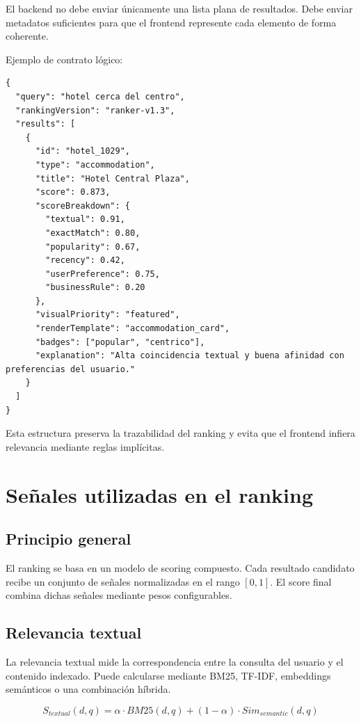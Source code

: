 \documentclass[12pt,a4paper]{article}
\begin{document}
El backend no debe enviar únicamente una lista plana de resultados. Debe enviar metadatos suficientes para que el frontend represente cada elemento de forma coherente.

Ejemplo de contrato lógico:

\begin{lstlisting}[caption={Ejemplo de respuesta enriquecida para ranking y renderizado}]
{
  "query": "hotel cerca del centro",
  "rankingVersion": "ranker-v1.3",
  "results": [
    {
      "id": "hotel_1029",
      "type": "accommodation",
      "title": "Hotel Central Plaza",
      "score": 0.873,
      "scoreBreakdown": {
        "textual": 0.91,
        "exactMatch": 0.80,
        "popularity": 0.67,
        "recency": 0.42,
        "userPreference": 0.75,
        "businessRule": 0.20
      },
      "visualPriority": "featured",
      "renderTemplate": "accommodation_card",
      "badges": ["popular", "centrico"],
      "explanation": "Alta coincidencia textual y buena afinidad con preferencias del usuario."
    }
  ]
}
\end{lstlisting}

Esta estructura preserva la trazabilidad del ranking y evita que el frontend infiera relevancia mediante reglas implícitas.

\section{Señales utilizadas en el ranking}

\subsection{Principio general}

El ranking se basa en un modelo de scoring compuesto. Cada resultado candidato recibe un conjunto de señales normalizadas en el rango $[0,1]$. El score final combina dichas señales mediante pesos configurables.

\subsection{Relevancia textual}

La relevancia textual mide la correspondencia entre la consulta del usuario y el contenido indexado. Puede calcularse mediante BM25, TF-IDF, embeddings semánticos o una combinación híbrida.

\[
S_{textual}(d,q) = \alpha \cdot BM25(d,q) + (1-\alpha) \cdot Sim_{semantic}(d,q)
\]
\end{document}

